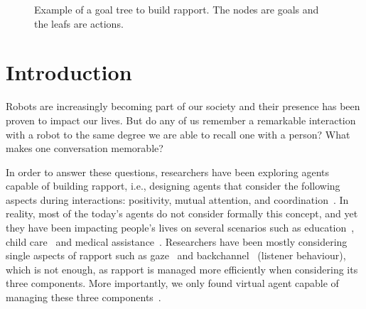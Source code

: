 
\begin{figure*}
	\centering
	\caption{Example of a goal tree to build rapport. The nodes are goals and the leafs are actions.}
	\label{table:BuildingRapportPlan}
\end{figure*}

\section{Introduction}
\label{sec:Introduction}

Robots are increasingly becoming part of our society and their presence has been proven to impact our lives. But do any of us remember a remarkable interaction with a robot to the same degree we are able to recall one with a person? What makes one conversation memorable? 

In order to answer these questions, researchers have been exploring agents capable of building rapport, i.e., designing agents that consider the following aspects during interactions: positivity, mutual attention, and coordination~\cite{Spencer-Oatey2005}. In reality, most of the today's agents do not consider formally this concept, and yet they have been impacting people's lives on several scenarios such as education~\cite{Burroughs2007}, child care~\cite{Burns1984} and medical assistance~\cite{Kang2005, Lisetti2013}. Researchers have been mostly considering single aspects of rapport such as gaze~\cite{Andrist2015, Mutlu2006, Stanton2014, Andrist2014, Baxter2014, Wang2010} and backchannel~\cite{Truong2011, Huang2010, Poppe2011, Poppe2010, Kok2012, Niewiadomski2009} (listener behaviour), which is not enough, as rapport is managed more efficiently when considering its three components. More importantly, we only found virtual agent capable of managing these three components~\cite{Buschmeier2011, Gratch2006}. 

